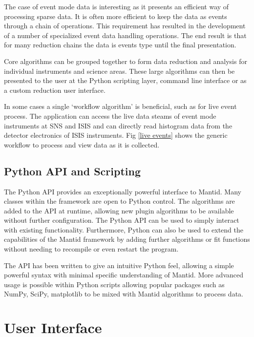 \documentclass[1p]{elsarticle}
\begin{document}
The case of event mode data is interesting as it presents an efficient way of processing sparse data. It is often more efficient to keep the data as events through a chain of operations. This requirement has resulted in the development of a number of specialized event data handling operations. The end result is that for many reduction chains the data is events type until the final presentation. 

Core algorithms can be grouped together to form data reduction and analysis for individual instruments and science areas. These large algorithms can then be presented to the user at the Python scripting layer, command line interface or as a custom reduction user interface. 

In some cases a single `workflow algorithm' is beneficial, such as for live event process. The application can access the live data steams of event mode instruments at SNS and ISIS and can directly read histogram data from the detector electronics of ISIS instruments. Fig \ref{live events} shows the generic workflow to process and view data as it is collected.

\subsection{Python API and Scripting}
The Python API provides an exceptionally powerful interface to Mantid. Many classes within the framework are open to Python control. The algorithms are added to the API at runtime, allowing new plugin algorithms to be available without further configuration. The Python API can be used to simply interact with existing functionality. Furthermore, Python can also be used to extend the capabilities of the Mantid framework by adding further algorithms or fit functions without needing to recompile or even restart the program.

The API has been written to give an intuitive Python feel, allowing a simple powerful syntax with minimal specific understanding of Mantid.  More advanced usage is possible within Python scripts allowing popular packages such as NumPy, SciPy, matplotlib \cite{numpy,scipy, matplotlib} to be mixed with Mantid algorithms to process data.  



\section{User Interface}
\end{document}
